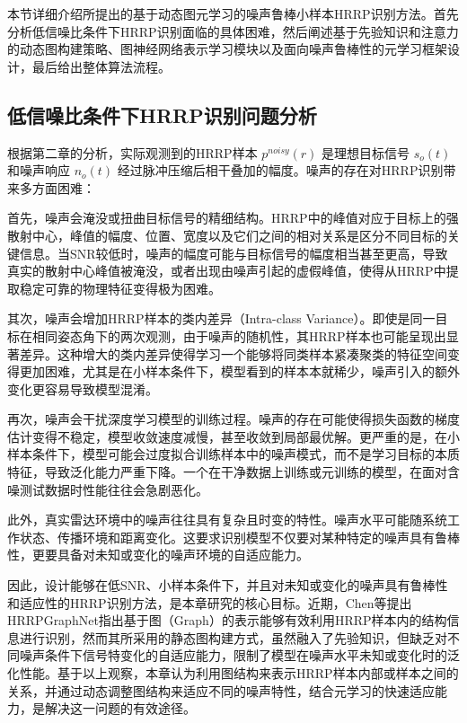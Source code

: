 本节详细介绍所提出的基于动态图元学习的噪声鲁棒小样本HRRP识别方法。首先分析低信噪比条件下HRRP识别面临的具体困难，然后阐述基于先验知识和注意力的动态图构建策略、图神经网络表示学习模块以及面向噪声鲁棒性的元学习框架设计，最后给出整体算法流程。

\subsection{低信噪比条件下HRRP识别问题分析}
\label{subsec:noise_challenge_analysis}

根据第二章的分析，实际观测到的HRRP样本 $p^{noisy}(r)$ 是理想目标信号 $s_o(t)$ 和噪声响应 $n_o(t)$ 经过脉冲压缩后相干叠加的幅度。噪声的存在对HRRP识别带来多方面困难：

首先，噪声会淹没或扭曲目标信号的精细结构。HRRP中的峰值对应于目标上的强散射中心，峰值的幅度、位置、宽度以及它们之间的相对关系是区分不同目标的关键信息。当SNR较低时，噪声的幅度可能与目标信号的幅度相当甚至更高，导致真实的散射中心峰值被淹没，或者出现由噪声引起的虚假峰值，使得从HRRP中提取稳定可靠的物理特征变得极为困难。

其次，噪声会增加HRRP样本的类内差异（Intra-class Variance）。即使是同一目标在相同姿态角下的两次观测，由于噪声的随机性，其HRRP样本也可能呈现出显著差异。这种增大的类内差异使得学习一个能够将同类样本紧凑聚类的特征空间变得更加困难，尤其是在小样本条件下，模型看到的样本本就稀少，噪声引入的额外变化更容易导致模型混淆。

再次，噪声会干扰深度学习模型的训练过程。噪声的存在可能使得损失函数的梯度估计变得不稳定，模型收敛速度减慢，甚至收敛到局部最优解。更严重的是，在小样本条件下，模型可能会过度拟合训练样本中的噪声模式，而不是学习目标的本质特征，导致泛化能力严重下降。一个在干净数据上训练或元训练的模型，在面对含噪测试数据时性能往往会急剧恶化。

此外，真实雷达环境中的噪声往往具有复杂且时变的特性。噪声水平可能随系统工作状态、传播环境和距离变化。这要求识别模型不仅要对某种特定的噪声具有鲁棒性，更要具备对未知或变化的噪声环境的自适应能力。

因此，设计能够在低SNR、小样本条件下，并且对未知或变化的噪声具有鲁棒性和适应性的HRRP识别方法，是本章研究的核心目标。近期，Chen等提出HRRPGraphNet指出基于图（Graph）的表示能够有效利用HRRP样本内的结构信息进行识别，然而其所采用的静态图构建方式，虽然融入了先验知识，但缺乏对不同噪声条件下信号特变化的自适应能力，限制了模型在噪声水平未知或变化时的泛化性能。基于以上观察，本章认为利用图结构来表示HRRP样本内部或样本之间的关系，并通过动态调整图结构来适应不同的噪声特性，结合元学习的快速适应能力，是解决这一问题的有效途径。

